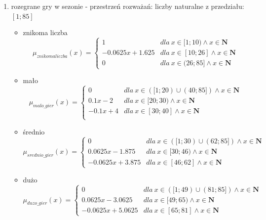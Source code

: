 \documentclass{classrep}
\begin{document}
\begin{enumerate}
    \item rozegrane gry w sezonie - przestrzeń rozważań: liczby naturalne z przedziału: $[1;85]$
     \begin{itemize}
        \item znikoma liczba
        \begin{equation}
            \mu_{znikomaliczba}(x) = \left\{\begin{matrix} 1 & dla \: x\in[1;10)  \wedge x\in \mathbf{N} \\ -0.0625x + 1.625 & dla \: x\in [10; 26]  \wedge x\in \mathbf{N} \\ 0 & dla \: x\in (26;85]  \wedge x\in \mathbf{N} \end{matrix}\right.
        \end{equation}
        \item mało
        \begin{equation}
            \mu_{malo\_gier}(x) = \left\{\begin{matrix}0 & dla \: x\in ([1;20) \cup (40;85]) \wedge x\in \mathbf{N} \\ 0.1x - 2 & dla \: x\in[20;30) \wedge x\in \mathbf{N} \\ -0.1x + 4 & dla \: x\in [30; 40] \wedge x\in \mathbf{N}\\ \end{matrix}\right.
        \end{equation}
        \item średnio
        \begin{equation}
            \mu_{srednio\_gier}(x) = \left\{\begin{matrix} 0 & dla \: x\in ([1;30) \cup (62;85]) \wedge x\in \mathbf{N} \\ 0.0625x - 1.875 & dla \: x\in[30;46) \wedge x\in \mathbf{N} \\ -0.0625x + 3.875 & dla \: x\in [46; 62] \wedge x\in \mathbf{N} \end{matrix}\right.
        \end{equation}
        \item dużo
        \begin{equation}
            \mu_{duzo\_gier}(x) = \left\{\begin{matrix} 0 & dla \: x\in ([1;49) \cup (81;85])  \wedge x\in \mathbf{N} \\ 0.0625x - 3.0625 & dla \: x\in[49;65) \wedge x\in \mathbf{N} \\ -0.0625x + 5.0625 & dla \: x\in [65; 81] \wedge x\in \mathbf{N} \end{matrix}\right.

\end{equation}
\end{itemize}
\end{enumerate}
\end{document}
